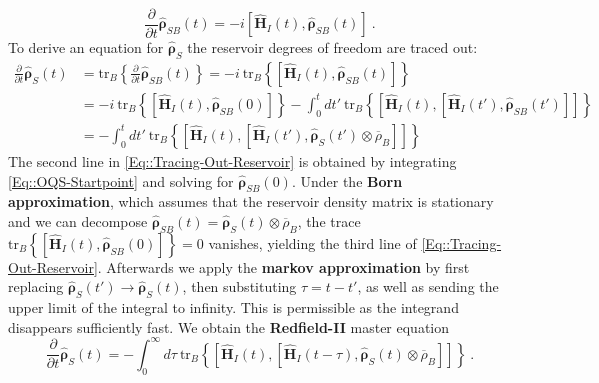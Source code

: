 	\begin{equation} \label{Eq::OQS-Startpoint}
		\frac{\partial}{\partial t}\boldsymbol{\hat{\rho}}_{SB}(t) =	- i \left[\boldsymbol{\hat{H}}_I(t), \boldsymbol{\hat{\rho}}_{SB}(t) \right] ~.
	\end{equation}
	To derive an equation for $\boldsymbol{\hat{\rho}}_S$ the reservoir degrees of freedom are traced out:
	\begin{equation} \label{Eq::Tracing-Out-Reservoir}
		\begin{split}
			\frac{\partial}{\partial t} \boldsymbol{\hat{\rho}}_S(t) &=	\text{tr}_B \left \lbrace \frac{\partial}{\partial t} \boldsymbol{\hat{\rho}}_{SB}(t) \right \rbrace =	-i~\text{tr}_B \left\lbrace \left[\boldsymbol{\hat{H}}_I(t), \boldsymbol{\hat{\rho}}_{SB}(t)\right] \right\rbrace  \\
			&=	-i~\text{tr}_B \left\lbrace \left[\boldsymbol{\hat{H}}_I(t), \boldsymbol{\hat{\rho}}_{SB}(0)\right] \right \rbrace - \int_{0}^{t} dt'~ \text{tr}_B \left\{  \left[\boldsymbol{\hat{H}}_I(t), \left[\boldsymbol{\hat{H}}_I(t'), \boldsymbol{\hat{\rho}}_{SB}(t') \right]\right]  \right\} \\
			&=- \int_{0}^{t} dt'~ \text{tr}_B \left\{  \left[\boldsymbol{\hat{H}}_I(t), \left[\boldsymbol{\hat{H}}_I(t'), \boldsymbol{\hat{\rho}}_S(t') \otimes \overline{\rho}_B \right]\right]  \right\}
		\end{split}
	\end{equation}
	The second line in \autoref{Eq::Tracing-Out-Reservoir} is obtained by integrating \autoref{Eq::OQS-Startpoint} and solving for $\boldsymbol{\hat{\rho}}_{SB}(0)$. Under the \textbf{Born approximation}, which assumes that the reservoir density matrix is stationary and we can decompose $\boldsymbol{\hat{\rho}}_{SB}(t) = \boldsymbol{\hat{\rho}}_S(t) \otimes \overline{\rho}_B$, the trace $\text{tr}_B \left\lbrace \left[\boldsymbol{\hat{H}}_I(t), \boldsymbol{\hat{\rho}}_{SB}(0)\right] \right \rbrace =	0$ vanishes, yielding the third line of \autoref{Eq::Tracing-Out-Reservoir}. Afterwards we apply the \textbf{markov approximation} \cite{landi2022nonequilibrium} by first replacing $\boldsymbol{\hat{\rho}}_S(t') \rightarrow \boldsymbol{\hat{\rho}}_S(t)$, then substituting $\tau =t - t'$, as well as sending the upper limit of the integral to infinity. This is permissible as the integrand disappears sufficiently fast. We obtain the \textbf{Redfield-II} master equation
	\begin{equation} \label{Eq::Redfield-II}
		\frac{\partial}{\partial t} \boldsymbol{\hat{\rho}}_S(t) = - \int_{0}^{\infty} d\tau~ \text{tr}_B \left\{  \left[\boldsymbol{\hat{H}}_I(t), \left[\boldsymbol{\hat{H}}_I(t - \tau), \boldsymbol{\hat{\rho}}_S(t) \otimes \overline{\rho}_B \right]\right]  \right\} ~.
	\end{equation}
